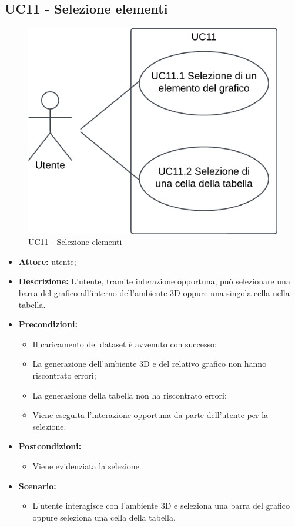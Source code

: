 \subsection{UC11 - Selezione elementi}
\begin{figure}[h!]\centering
    \includegraphics[scale=0.7]{template/images/UC11.png}
    \caption{UC11 - Selezione elementi}
\end{figure}
\begin{itemize}    
    \item \textbf{Attore:} utente;
    \item \textbf{Descrizione:} L'utente, tramite interazione opportuna, può selezionare una barra del grafico all'interno dell'ambiente 3D oppure una singola cella nella tabella.
    \item \textbf{Precondizioni:}    
        \begin{itemize}
            \item Il caricamento del dataset è avvenuto con successo;
            \item La generazione dell'ambiente 3D e del relativo grafico non hanno riscontrato errori;
            \item La generazione della tabella non ha riscontrato errori;
            \item Viene eseguita l'interazione opportuna da parte dell'utente per la selezione.
        \end{itemize}    
    \item \textbf{Postcondizioni:}
        \begin{itemize}
            \item Viene evidenziata la selezione.
        \end{itemize}    
    \item \textbf{Scenario:} 
        \begin{itemize}
            \item L'utente interagisce con l'ambiente 3D e seleziona una barra del grafico oppure seleziona una cella della tabella.
        \end{itemize}
\end{itemize}


